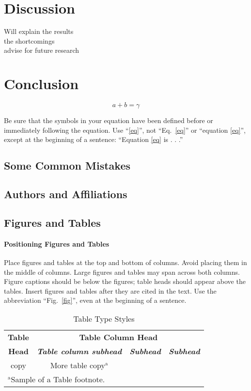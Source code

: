 \documentclass[conference]{IEEEtran}
\begin{document}
\section{Discussion}
Will explain the results\\
the shortcomings\\
advise for future research
\section{Conclusion}

\begin{equation}
a+b=\gamma\label{eq}
\end{equation}

Be sure that the 
symbols in your equation have been defined before or immediately following 
the equation. Use ``\eqref{eq}'', not ``Eq.~\eqref{eq}'' or ``equation \eqref{eq}'', except at 
the beginning of a sentence: ``Equation \eqref{eq} is . . .''

\subsection{Some Common Mistakes}\label{SCM}

\subsection{Authors and Affiliations}


\subsection{Figures and Tables}
\paragraph{Positioning Figures and Tables} Place figures and tables at the top and 
bottom of columns. Avoid placing them in the middle of columns. Large 
figures and tables may span across both columns. Figure captions should be 
below the figures; table heads should appear above the tables. Insert 
figures and tables after they are cited in the text. Use the abbreviation 
``Fig.~\ref{fig}'', even at the beginning of a sentence.

\begin{table}[htbp]
\caption{Table Type Styles}
\begin{center}
\begin{tabular}{|c|c|c|c|}
\hline
\textbf{Table}&\multicolumn{3}{|c|}{\textbf{Table Column Head}} \\
\cline{2-4} 
\textbf{Head} & \textbf{\textit{Table column subhead}}& \textbf{\textit{Subhead}}& \textbf{\textit{Subhead}} \\
\hline
copy& More table copy$^{\mathrm{a}}$& &  \\
\hline
\multicolumn{4}{l}{$^{\mathrm{a}}$Sample of a Table footnote.}
\end{tabular}
\label{tab1}
\end{center}
\end{table}




\vspace{12pt}
\end{document}
